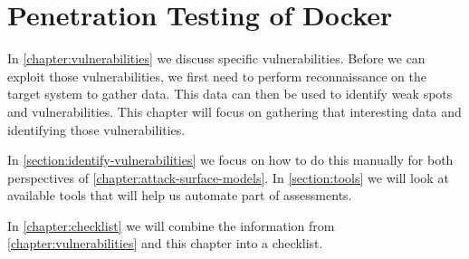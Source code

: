 \chapter{Penetration Testing of Docker}\label{chapter:pentesting}
In \autoref{chapter:vulnerabilities} we discuss specific vulnerabilities. Before we can exploit those vulnerabilities, we first need to perform reconnaissance on the target system to gather data. This data can then be used to identify weak spots and vulnerabilities. This chapter will focus on gathering that interesting data and identifying those vulnerabilities.

In \autoref{section:identify-vulnerabilities} we focus on how to do this manually for both perspectives of \autoref{chapter:attack-surface-models}. In \autoref{section:tools} we will look at available tools that will help us automate part of assessments.

In \autoref{chapter:checklist} we will combine the information from \autoref{chapter:vulnerabilities} and this chapter into a checklist.



